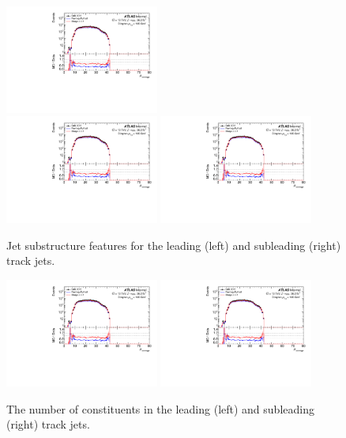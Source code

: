 \begin{figure}[h!]
      \includegraphics[page=120,width=0.45\textwidth]{figures/ZjetOmnifoldMCDataComp.pdf}\\
  \includegraphics[page=112,width=0.45\textwidth]{figures/ZjetOmnifoldMCDataComp.pdf}
      \includegraphics[page=124,width=0.45\textwidth]{figures/ZjetOmnifoldMCDataComp.pdf}
  \caption{Jet substructure features for the leading (left) and subleading (right) track jets.}
  \label{fig:jetsubstructure}
\end{figure}

\begin{figure}[h!]
  \centering
  \includegraphics[page=136,width=0.45\textwidth]{figures/ZjetOmnifoldMCDataComp.pdf}
  \includegraphics[page=140,width=0.45\textwidth]{figures/ZjetOmnifoldMCDataComp.pdf} \\
  \caption{The number of constituents in the leading (left) and subleading (right) track jets.}
  \label{fig:ntrackinjets}
\end{figure}

